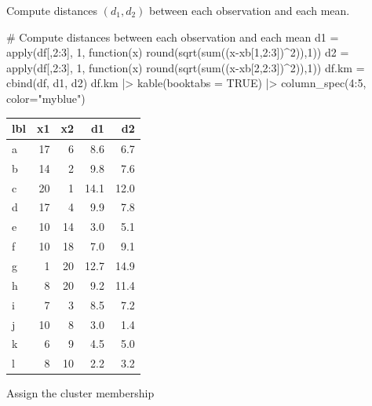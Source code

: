 \documentclass[a4paper]{article}
\begin{document}
\hspace{0.02\textwidth}
\begin{minipage}[t]{0.49\textwidth}
Compute distances $(d_1, d_2)$ between each observation and each mean.
\begin{center}
\begin{Schunk}
\begin{Sinput}
# Compute distances between each observation and each mean
d1 = apply(df[,2:3], 1, function(x) round(sqrt(sum((x-xb[1,2:3])^2)),1))
d2 = apply(df[,2:3], 1, function(x) round(sqrt(sum((x-xb[2,2:3])^2)),1))
df.km = cbind(df, d1, d2)
df.km |>
  kable(booktabs = TRUE) |>
  column_spec(4:5, color="myblue")
\end{Sinput}

\begin{tabular}{lrr>{}r>{}r}
\toprule
lbl & x1 & x2 & d1 & d2\\
\midrule
a & 17 & 6 & \textcolor{myblue}{8.6} & \textcolor{myblue}{6.7}\\
b & 14 & 2 & \textcolor{myblue}{9.8} & \textcolor{myblue}{7.6}\\
c & 20 & 1 & \textcolor{myblue}{14.1} & \textcolor{myblue}{12.0}\\
d & 17 & 4 & \textcolor{myblue}{9.9} & \textcolor{myblue}{7.8}\\
e & 10 & 14 & \textcolor{myblue}{3.0} & \textcolor{myblue}{5.1}\\
\addlinespace
f & 10 & 18 & \textcolor{myblue}{7.0} & \textcolor{myblue}{9.1}\\
g & 1 & 20 & \textcolor{myblue}{12.7} & \textcolor{myblue}{14.9}\\
h & 8 & 20 & \textcolor{myblue}{9.2} & \textcolor{myblue}{11.4}\\
i & 7 & 3 & \textcolor{myblue}{8.5} & \textcolor{myblue}{7.2}\\
j & 10 & 8 & \textcolor{myblue}{3.0} & \textcolor{myblue}{1.4}\\
\addlinespace
k & 6 & 9 & \textcolor{myblue}{4.5} & \textcolor{myblue}{5.0}\\
l & 8 & 10 & \textcolor{myblue}{2.2} & \textcolor{myblue}{3.2}\\
\bottomrule
\end{tabular}

\end{Schunk}
\end{center}
\end{minipage}
Assign the cluster membership\\
\end{document}

